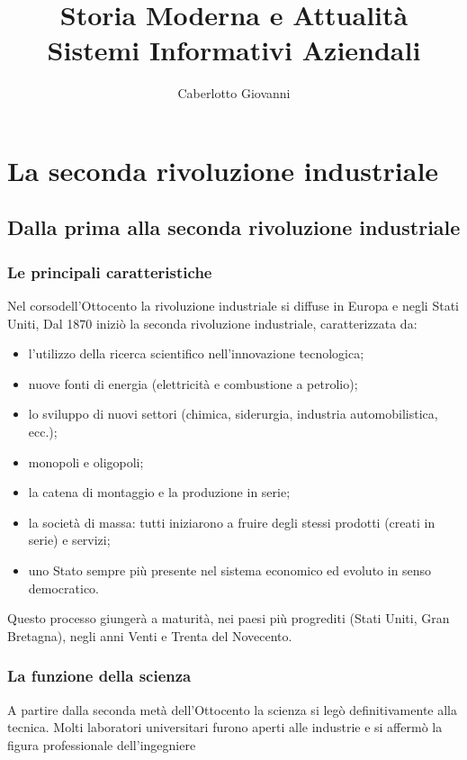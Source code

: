 \documentclass{report}
\title{\Huge{Storia Moderna e Attualità}\\Sistemi Informativi Aziendali}
\author{\huge{Caberlotto Giovanni}}
\date{}
\begin{document}
\maketitle
\newpage%
\tableofcontents
\pagebreak

\chapter{La seconda rivoluzione industriale} %
\label{chap:La seconda rivoluzione industriale}

\section{Dalla prima alla seconda rivoluzione industriale}
\subsection{Le principali caratteristiche}
Nel corsodell'Ottocento la rivoluzione industriale
si diffuse in Europa e negli Stati Uniti, Dal 1870
iniziò la seconda rivoluzione industriale, caratterizzata da:
\begin{itemize}
  \item l'utilizzo della ricerca scientifico nell'innovazione tecnologica;
  \item nuove fonti di energia (elettricità e combustione a petrolio);
  \item lo sviluppo di nuovi settori (chimica, siderurgia, industria automobilistica, ecc.);
  \item monopoli e oligopoli;
  \item la catena di montaggio e la produzione in serie;
  \item la società di massa: tutti iniziarono a fruire degli stessi prodotti (creati in serie) e servizi;
  \item uno Stato sempre più presente nel sistema economico ed evoluto in senso democratico.
\end{itemize}

Questo processo giungerà a maturità, nei paesi più progrediti (Stati Uniti, Gran Bretagna), negli anni Venti e Trenta del Novecento.

\subsection{La funzione della scienza}
A partire dalla seconda metà dell'Ottocento la scienza si legò definitivamente alla tecnica. Molti laboratori universitari furono aperti alle industrie e si affermò la figura professionale dell'ingegniere
\end{document}
